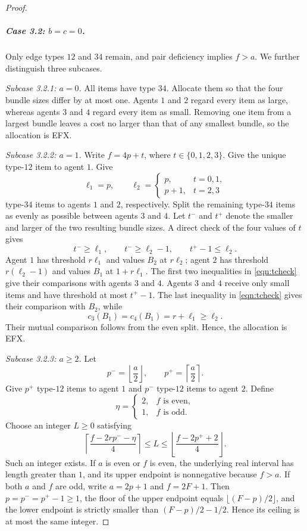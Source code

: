 \documentclass{article}
\theoremstyle{definition}
\begin{document}
\begin{proof}
\subparagraph{Case 3.2: $b=c=0$.}
Only edge types $12$ and $34$ remain, and pair deficiency implies $f>a$.
We further distinguish three subcases.

\medskip
\noindent\emph{Subcase 3.2.1: $a=0$.}
All items have type $34$.  Allocate them so that the four bundle sizes differ
by at most one.  Agents $1$ and $2$ regard every item as large, whereas agents
$3$ and $4$ regard every item as small.  Removing one item from a largest
bundle leaves a cost no larger than that of any smallest bundle, so the
allocation is EFX.

\medskip
\noindent\emph{Subcase 3.2.2: $a=1$.}
Write $f=4p+t$, where $t\in\{0,1,2,3\}$.  Give the unique type-$12$ item to
agent $1$.  Give
\[
 \ell_1=p,
 \qquad
 \ell_2=
 \begin{cases}
 p, & t=0,1,\\
 p+1, & t=2,3
 \end{cases}
\]
type-$34$ items to agents $1$ and $2$, respectively.  Split the remaining
type-$34$ items as evenly as possible between agents $3$ and $4$.  Let
$t^-$ and $t^+$ denote the smaller and larger of the two resulting bundle
sizes.  A direct check of the four values of $t$ gives
\begin{equation}\label{eqn:tcheck}
    t^-\ge \ell_1,
 \qquad
 t^-\ge \ell_2-1,
 \qquad
 t^+-1\le \ell_2.
\end{equation}
Agent $1$ has threshold $r\ell_1$ and values $B_2$ at $r\ell_2$; agent $2$
has threshold $r(\ell_2-1)$ and values $B_1$ at $1+r\ell_1$.  The first two
inequalities in \eqref{eqn:tcheck} give their comparisons with agents $3$ and $4$.
Agents $3$ and $4$ receive only small items and have threshold at most
$t^+-1$.  The last inequality in \eqref{eqn:tcheck} gives their comparison with $B_2$, while
\[
 c_3(B_1)=c_4(B_1)=r+\ell_1\ge \ell_2.
\]
Their mutual comparison follows from the even split.  Hence, the allocation is
EFX.

\medskip
\noindent\emph{Subcase 3.2.3: $a\ge 2$.}
Let
\[
 p^- =\left\lfloor\frac a2\right\rfloor,
 \qquad
 p^+ =\left\lceil\frac a2\right\rceil.
\]
Give $p^+$ type-$12$ items to agent $1$ and $p^-$ type-$12$ items to agent
$2$.  Define
\[
 \eta=
 \begin{cases}
 2, & f\text{ is even},\\
 1, & f\text{ is odd}.
 \end{cases}
\]
Choose an integer $L\ge 0$ satisfying
\begin{equation}\label{eqn:intervalL}
    \left\lceil\frac{f-2rp^- -\eta}{4}\right\rceil
 \le L\le
 \left\lfloor\frac{f-2p^+ +2}{4}\right\rfloor.
\end{equation}
Such an integer exists.  If $a$ is even or $f$ is even, the underlying real
interval has length greater than $1$, and its upper endpoint is nonnegative
because $f>a$.  If both $a$ and $f$ are odd, write $a=2p+1$ and $f=2F+1$.
Then $p=p^-=p^+-1\ge 1$, the floor of the upper endpoint equals
$\lfloor(F-p)/2\rfloor$, and the lower endpoint is strictly smaller than
$(F-p)/2-1/2$.  Hence its ceiling is at most the same integer.


\end{proof}
\end{document}
